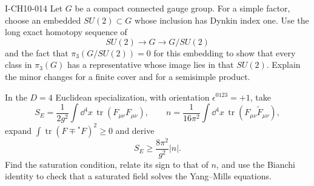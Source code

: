 \begin{exercise}{I-CH10-014}
Let $G$ be a compact connected gauge group.  For a simple factor, choose an
embedded $SU(2)\subset G$ whose inclusion has Dynkin index one.  Use the long
exact homotopy sequence of
\[
  SU(2)\longrightarrow G\longrightarrow G/SU(2)
\]
and the fact that $\pi_3(G/SU(2))=0$ for this embedding to show that every
class in $\pi_3(G)$ has a representative whose image lies in that $SU(2)$.
Explain the minor changes for a finite cover and for a semisimple product.

In the $D=4$ Euclidean specialization, with orientation $\epsilon^{0123}=+1$, take
\[
  S_E=\frac1{2g^2}\int\dd^4x\,
  \operatorname{tr}(F_{\mu\nu}F_{\mu\nu}),
  \qquad
  n=\frac1{16\pi^2}\int\dd^4x\,
  \operatorname{tr}(F_{\mu\nu}\widetilde F_{\mu\nu}),
\]
expand $\int\operatorname{tr}(F\mp{}^*F)^2\ge0$ and derive
\[
  S_E\ge\frac{8\pi^2}{g^2}|n|.
\]
Find the saturation condition, relate its sign to that of $n$, and use the
Bianchi identity to check that a saturated field solves the Yang--Mills
equations.
\end{exercise}
